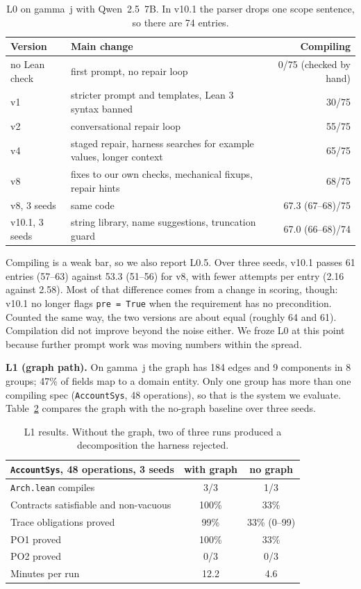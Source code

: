 \documentclass[10pt,a4paper]{article}
\newcommand{\code}[1]{\texttt{\small #1}}
\begin{document}
\begin{table}[h]
\centering\small
\begin{tabularx}{\linewidth}{@{}lXr@{}}
\toprule
Version & Main change & Compiling\\
\midrule
no Lean check & first prompt, no repair loop & 0/75 (checked by hand)\\
v1 & stricter prompt and templates, Lean 3 syntax banned & 30/75\\
v2 & conversational repair loop & 55/75\\
v4 & staged repair, harness searches for example values, longer context & 65/75\\
v8 & fixes to our own checks, mechanical fixups, repair hints & 68/75\\
v8, 3 seeds & same code & 67.3 (67--68)/75\\
v10.1, 3 seeds & string library, name suggestions, truncation guard & 67.0 (66--68)/74\\
\bottomrule
\end{tabularx}
\caption{L0 on gamma~j with Qwen~2.5~7B. In v10.1 the parser drops one scope sentence, so there are 74 entries.}
\label{tab:l0}
\end{table}

Compiling is a weak bar, so we also report L0.5. Over three seeds, v10.1 passes 61 entries (57--63) against 53.3 (51--56) for v8, with fewer attempts per entry (2.16 against 2.58). Most of that difference comes from a change in scoring, though: v10.1 no longer flags \code{pre = True} when the requirement has no precondition. Counted the same way, the two versions are about equal (roughly 64 and 61). Compilation did not improve beyond the noise either. We froze L0 at this point because further prompt work was moving numbers within the spread.

\textbf{L1 (graph path).} On gamma~j the graph has 184 edges and 9 components in 8 groups; 47\% of fields map to a domain entity. Only one group has more than one compiling spec (\code{AccountSys}, 48 operations), so that is the system we evaluate. Table~\ref{tab:l1} compares the graph with the no-graph baseline over three seeds.

\begin{table}[h]
\centering\small
\begin{tabular}{@{}lcc@{}}
\toprule
\code{AccountSys}, 48 operations, 3 seeds & with graph & no graph\\
\midrule
\code{Arch.lean} compiles & 3/3 & 1/3\\
Contracts satisfiable and non-vacuous & 100\% & 33\%\\
Trace obligations proved & 99\% & 33\% (0--99)\\
PO1 proved & 100\% & 33\%\\
PO2 proved & 0/3 & 0/3\\
Minutes per run & 12.2 & 4.6\\
\bottomrule
\end{tabular}
\caption{L1 results. Without the graph, two of three runs produced a decomposition the harness rejected.}
\label{tab:l1}
\end{table}
\end{document}
